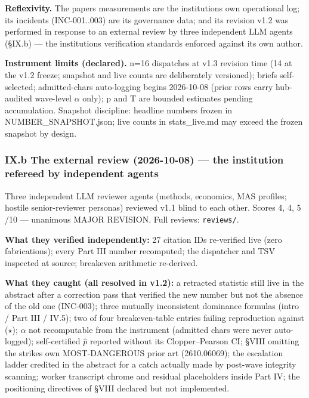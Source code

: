 \documentclass[
]{article}
\begin{document}
\textbf{Reflexivity.} The paper\textquotesingle s measurements are the
institution\textquotesingle s own operational log; its incidents
(INC-001..003) are its governance data; and its revision v1.2 was
performed in response to an external review by three independent LLM
agents (\S{}IX.b) --- the institution\textquotesingle s verification
standards enforced against its own author.

\textbf{Instrument limits (declared).} n=16 dispatches at v1.3 revision
time (14 at the v1.2 freeze; snapshot and live counts are deliberately
versioned); briefs self-selected; admitted-chars auto-logging begins
2026-10-08 (prior rows carry hub-audited wave-level $\alpha$ only); p and T are
bounded estimates pending accumulation. Snapshot discipline: headline
numbers frozen in NUMBER\_SNAPSHOT.json; live counts in stats\_live.md
may exceed the frozen snapshot by design.

\subsubsection{IX.b The external review (2026-10-08) --- the institution
refereed by independent
agents}\label{ixb-the-external-review-2026-10-08--the-institution-refereed-by-independent-agents}

Three independent LLM reviewer agents (methods, economics, MAS profiles;
hostile senior-reviewer personas) reviewed v1.1 blind to each other.
Scores 4, 4, 5 /10 --- unanimous MAJOR REVISION. Full reviews:
\texttt{reviews/}.

\textbf{What they verified independently:} 27 citation IDs re-verified
live (zero fabrications); every Part III number recomputed; the
dispatcher and TSV inspected at source; breakeven arithmetic re-derived.

\textbf{What they caught (all resolved in v1.2):} a retracted statistic
still live in the abstract after a correction pass that verified the new
number but not the absence of the old one (INC-003); three mutually
inconsistent dominance formulas (intro / Part III / IV.5); two of four
breakeven-table entries failing reproduction against ($\star$); $\alpha$ not
recomputable from the instrument (admitted chars were never
auto-logged); self-certified $\hat{p}$ reported without its Clopper--Pearson CI;
\S{}VIII omitting the strike\textquotesingle s own MOST-DANGEROUS prior art
(2610.06069); the escalation ladder credited in the abstract for a catch
actually made by post-wave integrity scanning; worker transcript chrome
and residual placeholders inside Part IV; the positioning directives of
\S{}VIII declared but not implemented.
\end{document}

